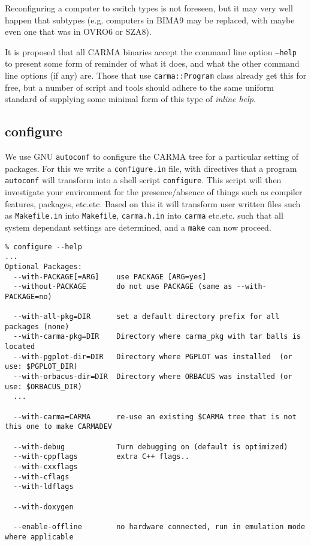 \documentclass{article}
\begin{document}
Reconfiguring a computer to switch types is not foreseen, but it may very
well happen that subtypes (e.g. computers in BIMA9 may be replaced, with maybe
even one that was in OVRO6 or SZA8).

It is proposed that all CARMA binaries accept the command line option
{\tt --help} to present some form of reminder of what it does, and what
the other command line options (if any) are. Those that use 
{\tt carma::Program} class already get this for free, but a number
of script and tools should adhere to the same uniform standard
of supplying some minimal form of this type of {\it inline help}.

\subsection{configure}

We use GNU {\tt autoconf} to configure the CARMA tree for a particular
setting of packages. For this we write a {\tt configure.in} file, with
directives that a program  {\tt autoconf} will transform into a shell script
{\tt configure}. This script will then investigate your environment for
the presence/absence of things such as compiler features, packages, etc.etc.
Based on this it will transform user written files such as 
{\tt Makefile.in} into {\tt Makefile},  {\tt carma.h.in} into {\tt carma} etc.etc.
such that all system dependant settings are determined, and a {\tt make} can now
proceed.

\footnotesize
\begin{verbatim}
% configure --help
...
Optional Packages:
  --with-PACKAGE[=ARG]    use PACKAGE [ARG=yes]
  --without-PACKAGE       do not use PACKAGE (same as --with-PACKAGE=no)

  --with-all-pkg=DIR      set a default directory prefix for all packages (none)
  --with-carma-pkg=DIR    Directory where carma_pkg with tar balls is located
  --with-pgplot-dir=DIR   Directory where PGPLOT was installed  (or use: $PGPLOT_DIR)
  --with-orbacus-dir=DIR  Directory where ORBACUS was installed (or use: $ORBACUS_DIR)
  ...

  --with-carma=CARMA      re-use an existing $CARMA tree that is not this one to make CARMADEV

  --with-debug            Turn debugging on (default is optimized)
  --with-cppflags         extra C++ flags..
  --with-cxxflags
  --with-cflags
  --with-ldflags

  --with-doxygen

  --enable-offline        no hardware connected, run in emulation mode where applicable

\end{verbatim}
\normalsize           %
\end{document}
